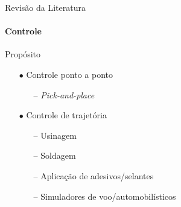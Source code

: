 \documentclass[25pt,landscape]{beamer}
\begin{document}
\begin{frame}{Revisão da Literatura}
    \framesubtitle{Controle}
    	\pause
        \begin{block}{Propósito}
    	\begin{itemize}
    		\pause
    		\item[$\bullet$] Controle ponto a ponto
    		\begin{itemize}
    			\pause
    			\item[--] \emph{Pick-and-place} \\[6pt]
    		\end{itemize}
    		\pause
    		\item[$\bullet$] Controle de trajetória
    		\begin{itemize}
    			\pause
    			\item[--] Usinagem \\[6pt]
    			\item[--] Soldagem \\[6pt]
    			\item[--] Aplicação de adesivos/selantes \\[6pt]
    			\item[--] Simuladores de voo/automobilísticos \\[6pt]
    		\end{itemize}
    	\end{itemize}
    \end{block}
\end{frame}
\end{document}
